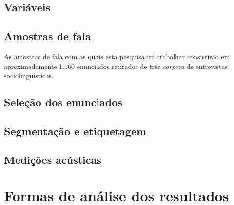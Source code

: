 \documentclass[
	a4paper,	%
	12pt,		%
	]{article}	%
\begin{document}
	\subsection{Variáveis} \label{variaveis}

	\subsection{Amostras de fala} 
	\label{amostra}
	
	As amostras de fala com as quais esta pesquisa irá trabalhar consistirão em aproximadamente
	1.160 enunciados retirados de três \emph{corpora} de entrevistas sociolinguísticas. 
	
	\subsection{Seleção dos enunciados} 
	\label{selecao}

	\subsection{Segmentação e etiquetagem} 
	\label{segm}

	\subsection{Medições acústicas} 
	\label{medicoes}
	
\section{Formas de análise dos resultados} 
\label{analise}

{ %
	\printbibliography
}
\end{document}
